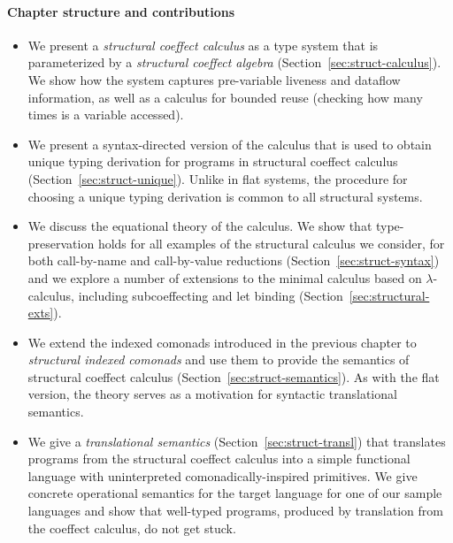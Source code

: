 \paragraph{Chapter structure and contributions}
\begin{itemize}
\item We present a \emph{structural coeffect calculus} as a type system that is parameterized
  by a \emph{structural coeffect algebra} (Section~\ref{sec:struct-calculus}). We show how the
  system captures pre-variable liveness and dataflow information, as well as a calculus for bounded
  reuse (checking how many times is a variable accessed).

\item We present a syntax-directed version of the calculus that is used to obtain unique typing
  derivation for programs in structural coeffect calculus (Section~\ref{sec:struct-unique}).
  Unlike in flat systems, the procedure for choosing a unique typing derivation is common to all
  structural systems.

\item We discuss the equational theory of the calculus. We show that type-preservation
  holds for all examples of the structural calculus we consider, for both call-by-name and call-by-value
  reductions (Section~\ref{sec:struct-syntax}) and we
  explore a number of extensions to the minimal calculus based on $\lambda$-calculus,
  including subcoeffecting and let binding (Section~\ref{sec:structural-exts}).

\item We extend the indexed comonads introduced in the previous chapter to \emph{structural indexed
  comonads} and use them to provide the semantics of structural coeffect calculus
  (Section~\ref{sec:struct-semantics}). As with the flat version, the theory serves as a motivation
  for syntactic translational semantics.

\item We give a \emph{translational semantics} (Section~\ref{sec:struct-transl}) that translates
  programs from the structural coeffect calculus into a simple functional language with
  uninterpreted comonadically-inspired primitives. We give concrete operational semantics for the
  target language for one of our sample languages and show that well-typed programs, produced by
  translation from the coeffect calculus, do not get stuck.
\end{itemize}


%
%

